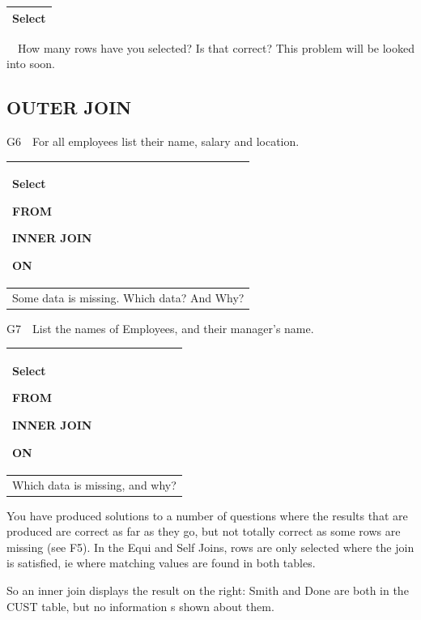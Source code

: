 \begin{flushleft}
\tablefirsthead{}
\tablehead{}
\tabletail{}
\tablelasttail{}
\begin{supertabular}{|m{14.793cm}|}
\hline
Select

\\\hline
\end{supertabular}
\end{flushleft}
\ \ How many rows have you selected?  Is that correct?  This problem will be looked into soon.

\subsection{OUTER JOIN}
G6\ \ For all employees list their name, salary and location.

\begin{flushleft}
\tablefirsthead{}
\tablehead{}
\tabletail{}
\tablelasttail{}
\begin{supertabular}{|m{14.583cm}|}
\hline
Select

FROM

INNER JOIN

ON\\\hline
Some data is missing. Which data? And Why?

\\\hline
\end{supertabular}
\end{flushleft}
G7\ \ List the names of Employees, and their manager's name.  

\begin{flushleft}
\tablefirsthead{}
\tablehead{}
\tabletail{}
\tablelasttail{}
\begin{supertabular}{|m{14.583cm}|}
\hline
Select

FROM

INNER JOIN

ON\\\hline
Which data is missing, and why?

\\\hline
\end{supertabular}
\end{flushleft}
You have produced solutions to a number of questions where the results that are produced are correct as far as they go, but not totally correct as some rows are missing (see F5).  In the Equi and Self Joins, rows are only selected where the join is satisfied, ie where matching values are found in both tables.

So an inner join displays the result on the right: Smith and Done are both in the CUST table, but no information s shown about them.


